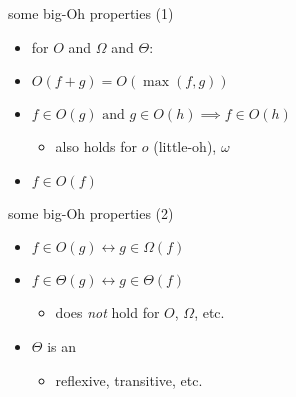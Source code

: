 \begin{frame}{some big-Oh properties (1)} 
\newcommand{\biimplies}{\leftrightarrow}
\begin{itemize}
    \item for $O$ and $\Omega$ and $\Theta$:
    \item $O(f+g) = O(\max(f,g))$
    \item $f\in O(g)\text{ and }g\in O(h)\implies f \in O(h)$
        \begin{itemize}
        \item also holds for $o$ (little-oh), $\omega$
        \end{itemize}
    \item $f\in O(f)$
\end{itemize}
\end{frame}

\begin{frame}{some big-Oh properties (2)}
\newcommand{\biimplies}{\leftrightarrow}
\begin{itemize}
    \item $f \in O(g) \biimplies g \in \Omega(f)$
    \item $f\in\Theta(g) \biimplies g\in\Theta(f)$
        \begin{itemize}
        \item does \textit{not} hold for $O$, $\Omega$, etc.
        \end{itemize}
    \item $\Theta$ is an 
        \begin{itemize}
        \item reflexive, transitive, etc.
        \end{itemize}
\end{itemize}
\end{frame}
